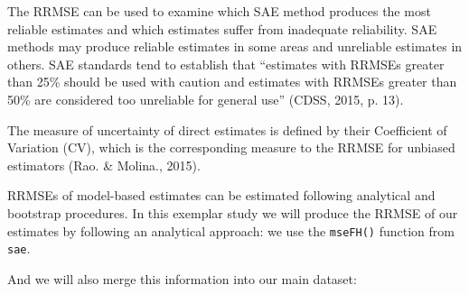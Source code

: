 \documentclass[
]{article}
\newenvironment{Shaded}{\begin{snugshade}}{\end{snugshade}}
\newcommand{\CommentTok}[1]{\textcolor[rgb]{0.56,0.35,0.01}{\textit{#1}}}
\newcommand{\DataTypeTok}[1]{\textcolor[rgb]{0.13,0.29,0.53}{#1}}
\newcommand{\DecValTok}[1]{\textcolor[rgb]{0.00,0.00,0.81}{#1}}
\newcommand{\KeywordTok}[1]{\textcolor[rgb]{0.13,0.29,0.53}{\textbf{#1}}}
\newcommand{\NormalTok}[1]{#1}
\newcommand{\OperatorTok}[1]{\textcolor[rgb]{0.81,0.36,0.00}{\textbf{#1}}}
\newcommand{\StringTok}[1]{\textcolor[rgb]{0.31,0.60,0.02}{#1}}
\begin{document}
The RRMSE can be used to examine which SAE method produces the most
reliable estimates and which estimates suffer from inadequate
reliability. SAE methods may produce reliable estimates in some areas
and unreliable estimates in others. SAE standards tend to establish that
``estimates with RRMSEs greater than 25\% should be used with caution
and estimates with RRMSEs greater than 50\% are considered too
unreliable for general use'' (CDSS, 2015, p. 13).

The measure of uncertainty of direct estimates is defined by their
Coefficient of Variation (CV), which is the corresponding measure to the
RRMSE for unbiased estimators (Rao. \& Molina., 2015).

RRMSEs of model-based estimates can be estimated following analytical
and bootstrap procedures. In this exemplar study we will produce the
RRMSE of our estimates by following an analytical approach: we use the
\texttt{mseFH()} function from \texttt{sae}.

\begin{Shaded}
\end{Shaded}

And we will also merge this information into our main dataset:

\begin{Shaded}
\end{Shaded}
\end{document}
